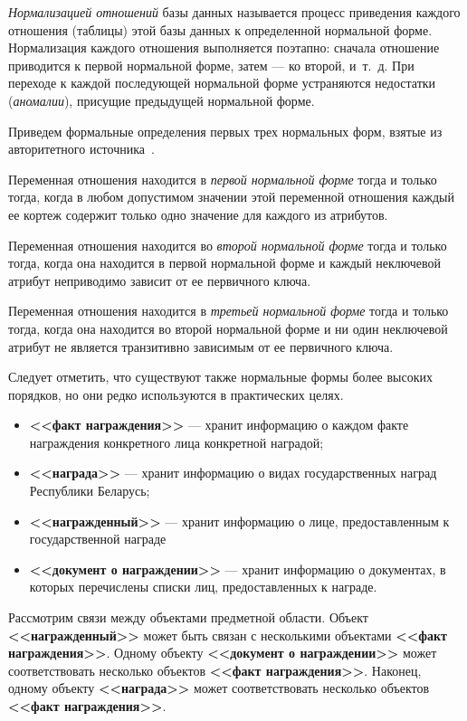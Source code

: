 \textit{Нормализацией отношений} базы данных называется процесс приведения каждого отношения (таблицы) этой базы данных
к определенной нормальной форме. Нормализация каждого отношения выполняется поэтапно: сначала отношение приводится
к первой нормальной форме, затем --- ко второй, и~т.~д.
При переходе к каждой последующей нормальной форме устраняются недостатки
(\textit{аномалии}), присущие предыдущей нормальной форме.

Приведем формальные определения первых трех нормальных форм, взятые из авторитетного источника~\cite{date05}.

Переменная отношения находится в \textit{первой нормальной форме} тогда
и только тогда, когда в любом допустимом значении этой переменной отношения каждый
ее кортеж содержит только одно значение для каждого из атрибутов.

Переменная отношения находится во \textit{второй нормальной форме} тогда и только тогда,
когда она находится в первой нормальной форме и каждый неключевой атрибут
неприводимо зависит от ее первичного ключа.

Переменная отношения находится в \textit{третьей нормальной форме} тогда и только тогда,
когда она находится во второй нормальной форме и ни один неключевой атрибут не является
транзитивно зависимым от ее первичного ключа.

Следует отметить, что существуют также нормальные формы более высоких порядков,
но они редко используются в практических целях.  

\begin{itemize}
\item \textbf{<<факт награждения>>} --- хранит информацию о каждом факте награждения
  конкретного лица конкретной наградой;
\item \textbf{<<награда>>} --- хранит информацию о видах государственных наград
  Республики Беларусь;
\item \textbf{<<награжденный>>} --- хранит информацию о лице, предоставленным
  к государственной награде
\item \textbf{<<документ о награждении>>} --- хранит информацию о документах,
  в которых перечислены списки лиц, предоставленных к награде.
\end{itemize}

Рассмотрим связи между объектами предметной области.
Объект \textbf{<<награжденный>>} может быть связан с несколькими
объектами \textbf{<<факт награждения>>}.
Одному объекту \textbf{<<документ о награждении>>} может соответствовать несколько
объектов \textbf{<<факт награждения>>}.
Наконец, одному объекту \textbf{<<награда>>} может соответствовать несколько объектов
\textbf{<<факт награждения>>}.

